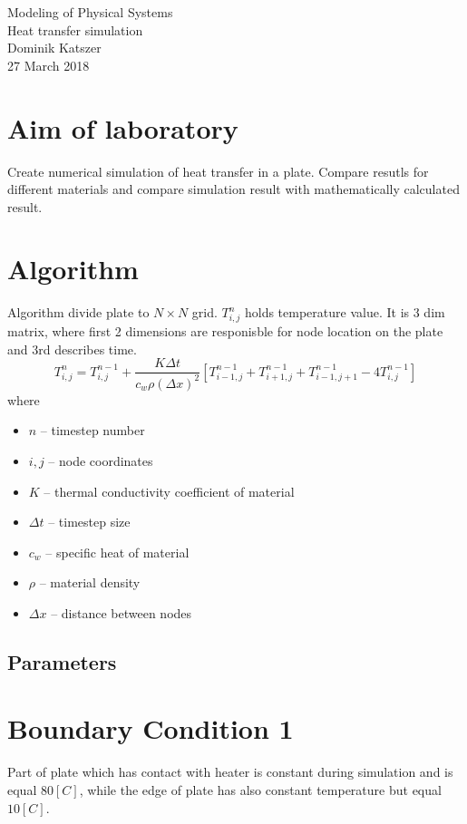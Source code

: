 \documentclass[a4paper,12pt]{article}
\begin{document}
\begin{titlepage}
\center
\vspace*{\fill}
\Huge{Modeling of Physical Systems}\\
\Large{Heat transfer simulation}\\
\vspace*{1.5cm}
Dominik Katszer\\
\large{27 March 2018}
\vspace*{1.5cm}
\vspace*{\fill}
\end{titlepage}
\section{Aim of laboratory}
Create numerical simulation of heat transfer in a plate. Compare resutls for different materials and compare simulation result with mathematically calculated result.
\section{Algorithm}
Algorithm divide plate to $N\times N$ grid. $T^n_{i,j}$ holds temperature value. It is 3 dim matrix, where first 2 dimensions are responisble for node location on the plate and 3rd describes time.
\begin{equation*}
T^n_{i,j} = T^{n-1}_{i,j} + \frac{K\Delta t}{c_w \rho (\Delta x)^2}\left[T^{n-1}_{i - 1,j} + T^{n-1}_{i + 1,j} + T^{n-1}_{i - 1,j + 1} - 4T^{n-1}_{i,j}\right]
\end{equation*}
where
\begin{itemize}
	\item $n$ -- timestep number
	\item $i,j$ -- node coordinates
	\item $K$ -- thermal conductivity coefficient of material
	\item $\Delta t$ -- timestep size
	\item $c_w$ -- specific heat of material
	\item $\rho$ -- material density
	\item $\Delta x$ -- distance between nodes
\end{itemize}
\subsection{Parameters}

\section{Boundary Condition 1}
Part of plate which has contact with heater is constant during simulation and is equal $80[C]$, while the edge of plate has also constant temperature but equal $10[C]$.
\end{document}

